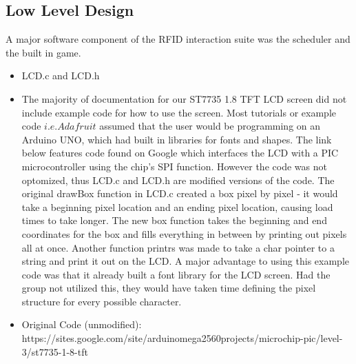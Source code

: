 \documentclass[12pt]{article} %
\begin{document}


\subsection{Low Level Design}\label{swLowLevel} %
%

A major software component of the RFID interaction suite was the scheduler and the built in game.

\begin{itemize}
	\item LCD.c and LCD.h
		\item The majority of documentation for our ST7735 1.8 TFT LCD screen did not include example code for how to use the screen. Most tutorials or example code \(i.e. Adafruit\) assumed that the user would be programming on an Arduino UNO, which had built in libraries for fonts and shapes. The link below features code found on Google which interfaces the LCD with a PIC microcontroller using the chip's SPI function. However the code was not optomized, thus LCD.c and LCD.h are modified versions of the code. The original drawBox function in LCD.c created a box pixel by pixel - it would take a beginning pixel location and an ending pixel location, causing load times to take longer. The new box function takes the beginning and end coordinates for the box and fills everything in between by printing out pixels all at once. Another function printrs was made to take a char pointer to a string and print it out on the LCD. A major advantage to using this example code was that it already built a font library for the LCD screen. Had the group not utilized this, they would have taken time defining the pixel structure for every possible character. 
		\item Original Code (unmodified): https://sites.google.com/site/arduinomega2560projects/microchip-pic/level-3/st7735-1-8-tft
	\end {itemize}
\end{document}
